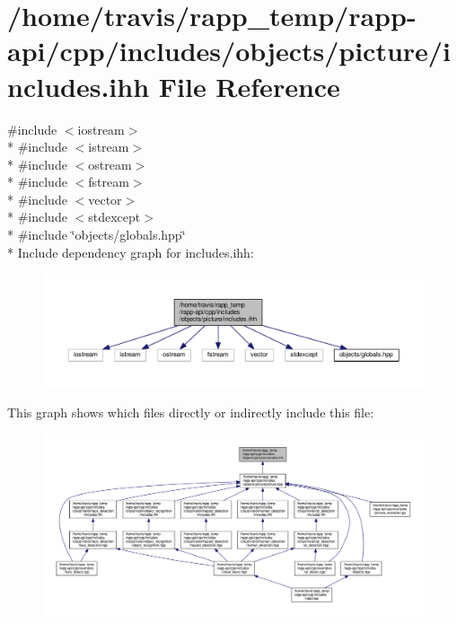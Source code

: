 \hypertarget{objects_2picture_2includes_8ihh}{\section{/home/travis/rapp\-\_\-temp/rapp-\/api/cpp/includes/objects/picture/includes.ihh File Reference}
\label{objects_2picture_2includes_8ihh}
}
{\ttfamily \#include $<$iostream$>$}\\*
{\ttfamily \#include $<$istream$>$}\\*
{\ttfamily \#include $<$ostream$>$}\\*
{\ttfamily \#include $<$fstream$>$}\\*
{\ttfamily \#include $<$vector$>$}\\*
{\ttfamily \#include $<$stdexcept$>$}\\*
{\ttfamily \#include \char`\"{}objects/globals.\-hpp\char`\"{}}\\*
Include dependency graph for includes.\-ihh\-:
\nopagebreak
\begin{figure}[H]
\begin{center}
\leavevmode
\includegraphics[width=350pt]{objects_2picture_2includes_8ihh__incl}
\end{center}
\end{figure}
This graph shows which files directly or indirectly include this file\-:
\nopagebreak
\begin{figure}[H]
\begin{center}
\leavevmode
\includegraphics[width=350pt]{objects_2picture_2includes_8ihh__dep__incl}
\end{center}
\end{figure}
